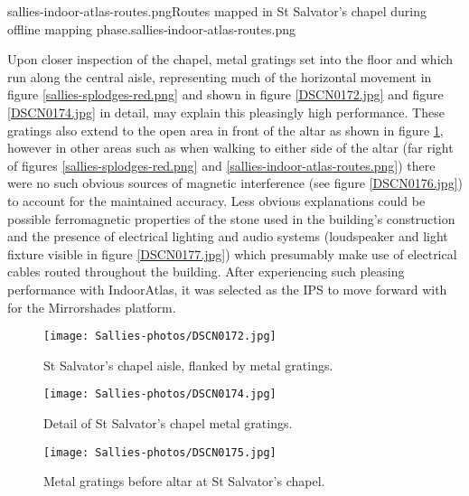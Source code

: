        {sallies-indoor-atlas-routes.png}{Routes mapped in St Salvator's chapel during offline mapping phase.}{sallies-indoor-atlas-routes.png}

Upon closer inspection of the chapel, metal gratings set into the floor and which run along the central aisle, representing much of the horizontal movement in figure \ref{sallies-splodges-red.png} and shown in figure \ref{DSCN0172.jpg} and figure \ref{DSCN0174.jpg} in detail, may explain this pleasingly high performance. These gratings also extend to the open area in front of the altar as shown in figure \ref{DSCN0175.jpg}, however in other areas such as when walking to either side of the altar (far right of figures \ref{sallies-splodges-red.png} and \ref{sallies-indoor-atlas-routes.png}) there were no such obvious sources of magnetic interference (see figure \ref{DSCN0176.jpg}) to account for the maintained accuracy. Less obvious explanations could be possible ferromagnetic properties of the stone used in the building's construction and the presence of electrical lighting and audio systems (loudspeaker and light fixture visible in figure \ref{DSCN0177.jpg}) which presumably make use of electrical cables routed throughout the building. After experiencing such pleasing performance with IndoorAtlas, it was selected as the IPS to move forward with for the Mirrorshades platform.

\begin{figure}[h]
    \begin{center}
    \begin{minipage}{.32\textwidth}
        \begin{center}
        \texttt{[image: Sallies-photos/DSCN0172.jpg]}
        \caption{St Salvator's chapel aisle, flanked by metal gratings.}
        \label{DSCN0172.jpg}
        \end{center}
    \end{minipage}%
    \hspace{.01\textwidth}
    \begin{minipage}{.32\textwidth}
		\begin{center}
        \texttt{[image: Sallies-photos/DSCN0174.jpg]}
        \caption{Detail of St Salvator's chapel metal gratings.}
        \label{DSCN0174.jpg}
        \end{center}
    \end{minipage}%
    \hspace{.01\textwidth}
    \begin{minipage}{.32\textwidth}
        \begin{center}
        \texttt{[image: Sallies-photos/DSCN0175.jpg]}
        \caption{Metal gratings before altar at St Salvator's chapel.}
        \label{DSCN0175.jpg}
        \end{center}
    \end{minipage}
    \end{center}
\end{figure}

